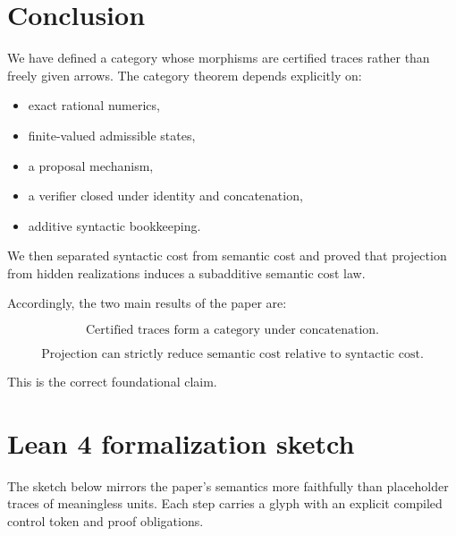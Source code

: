 \documentclass[11pt]{article}
\begin{document}
\section{Conclusion}

We have defined a category whose morphisms are certified traces rather than freely given arrows. The category theorem depends explicitly on:
\begin{itemize}[leftmargin=2em]
\item exact rational numerics,
\item finite-valued admissible states,
\item a proposal mechanism,
\item a verifier closed under identity and concatenation,
\item additive syntactic bookkeeping.
\end{itemize}

We then separated syntactic cost from semantic cost and proved that projection from hidden realizations induces a subadditive semantic cost law.

Accordingly, the two main results of the paper are:

\[
\boxed{
\text{Certified traces form a category under concatenation.}
}
\]

\[
\boxed{
\text{Projection can strictly reduce semantic cost relative to syntactic cost.}
}
\]

This is the correct foundational claim.

\appendix

\section{Lean 4 formalization sketch}

The sketch below mirrors the paper's semantics more faithfully than placeholder traces of meaningless units. Each step carries a glyph with an explicit compiled control token and proof obligations.
\end{document}
